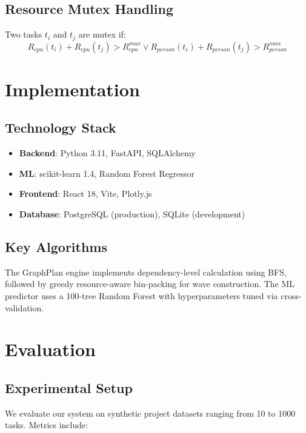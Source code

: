 \documentclass[11pt,a4paper]{article}
\begin{document}
\subsection{Resource Mutex Handling}

Two tasks $t_i$ and $t_j$ are mutex if:
\begin{equation}
R_{cpu}(t_i) + R_{cpu}(t_j) > R_{cpu}^{max} \lor R_{person}(t_i) + R_{person}(t_j) > R_{person}^{max}
\end{equation}

\section{Implementation}
\label{sec:implementation}

\subsection{Technology Stack}

\begin{itemize}
    \item \textbf{Backend}: Python 3.11, FastAPI, SQLAlchemy
    \item \textbf{ML}: scikit-learn 1.4, Random Forest Regressor
    \item \textbf{Frontend}: React 18, Vite, Plotly.js
    \item \textbf{Database}: PostgreSQL (production), SQLite (development)
\end{itemize}

\subsection{Key Algorithms}

The GraphPlan engine implements dependency-level calculation using BFS, followed by greedy resource-aware bin-packing for wave construction. The ML predictor uses a 100-tree Random Forest with hyperparameters tuned via cross-validation.

\section{Evaluation}
\label{sec:evaluation}

\subsection{Experimental Setup}

We evaluate our system on synthetic project datasets ranging from 10 to 1000 tasks. Metrics include:
\end{document}
